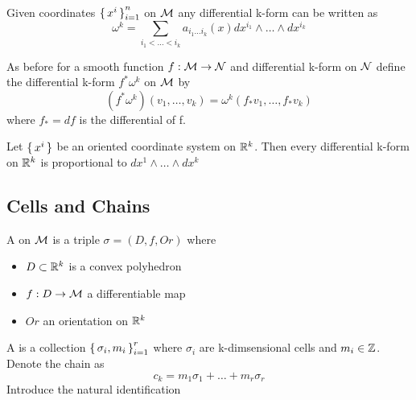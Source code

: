\documentclass{article}
\begin{document}
\begin{theorem}
Given coordinates $\set{x^i}_{i=1}^n$ on $\mathcal{M}$ any differential k-form can be written as 
\[
\omega^k = \sum_{i_1<\dots<i_k} a_{i_1 \dots i_k}(x) dx^{i_1} \wedge \dots \wedge dx^{i_k}
\]
\end{theorem}

\begin{definition}
As before for a smooth function $f:\mathcal{M}\to\mathcal{N}$ and differential k-form on $\mathcal{N}$ define the differential k-form $f^\ast\omega^k$ on $\mathcal{M}$ by 
\[
(f^\ast\omega^k)(v_1,\dots,v_k) = \omega^k(f_\ast v_1, \dots, f_\ast v_k)
\]
where $f_\ast = df$ is the differential of f. 
\end{definition}

\begin{theorem}
Let $\set{x^i}$ be an oriented coordinate system on $\mathbb{R}^k$. Then every differential k-form on $\mathbb{R}^k$ is proportional to $dx^1 \wedge \dots \wedge dx^k$
\end{theorem}

\subsection{Cells and Chains}

\begin{definition}
A  on $\mathcal{M}$ is a triple $\sigma=(D,f,Or)$ where 
\begin{itemize}
    \item $D\subset\mathbb{R}^k$ is a convex polyhedron
    \item $f:D\to\mathcal{M}$ a differentiable map
    \item $Or$ an orientation on $\mathbb{R}^k$
\end{itemize}
\end{definition}

\begin{definition}
A  is a collection $\set{\sigma_i, m_i}_{i=1}^r$ where $\sigma_i$ are k-dimsensional cells and $m_i \in \mathbb{Z}$. Denote the chain as 
\[
c_k = m_1 \sigma_1 + \dots + m_r \sigma_r
\]
Introduce the natural identification 
\end{definition}
\end{document}

